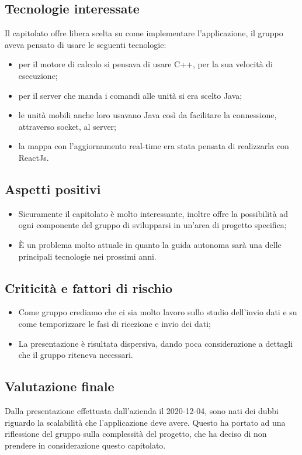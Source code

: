 \subsection{Tecnologie interessate}
Il capitolato offre libera scelta su come implementare l'applicazione, il gruppo aveva pensato di usare le seguenti tecnologie:
\begin{itemize}
\item per il motore di calcolo si pensava di usare C++, per la sua velocità di esecuzione;
\item per il server che manda i comandi alle unità si era scelto Java;
\item le unità mobili anche loro usavano Java così da facilitare la connessione, attraverso socket, al server;
\item la mappa con l'aggiornamento real-time era stata pensata di realizzarla con ReactJs.
\end{itemize}

\subsection{Aspetti positivi}
\begin{itemize}
\item Sicuramente il capitolato è molto interessante, inoltre offre la possibilità ad ogni componente del gruppo di svilupparsi in un'area di progetto specifica;
\item È un problema molto attuale in quanto la guida autonoma sarà una delle principali tecnologie nei prossimi anni.
\end{itemize}

\subsection{Criticità e fattori di rischio}
\begin{itemize}
\item Come gruppo crediamo che ci sia molto lavoro sullo studio dell'invio dati e su come temporizzare le fasi di ricezione e invio dei dati;
\item La presentazione è risultata dispersiva, dando poca considerazione a dettagli che il gruppo riteneva necessari.  
\end{itemize}

\subsection{Valutazione finale}
Dalla presentazione effettuata dall'azienda il 2020-12-04, sono nati dei dubbi riguardo la scalabilità che l'applicazione deve avere. Questo ha portato ad una riflessione del gruppo sulla complessità del progetto, che ha deciso di non prendere in considerazione questo capitolato.